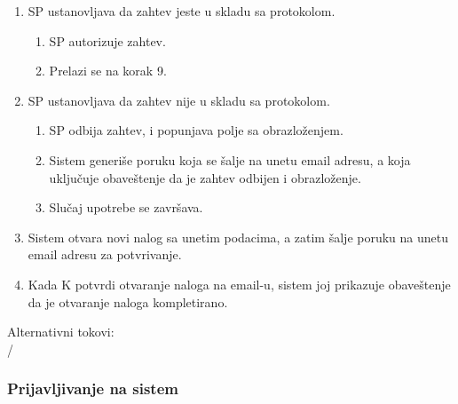 \begin{enumerate}
	\item SP ustanovljava da zahtev jeste u skladu sa protokolom.
	\begin{enumerate}
		\item SP autorizuje zahtev.
		\item Prelazi se na korak 9.
	\end{enumerate}
	\item SP ustanovljava da zahtev nije u skladu sa protokolom.
	\begin{enumerate}
		\item SP odbija zahtev, i popunjava polje sa obrazlo\v zenjem.
		\item Sistem generi\v se poruku koja se \v salje na unetu email adresu, a koja uklju\v cuje obave\v stenje da je zahtev odbijen i obrazlo\v zenje.
		\item Slu\v caj upotrebe se zavr\v sava.
	\end{enumerate}
	\item Sistem otvara novi nalog sa unetim podacima, a zatim \v salje poruku na unetu email adresu za potvr\dj ivanje.
	\item Kada K potvrdi otvaranje naloga na email-u, sistem joj prikazuje obave\v stenje da je otvaranje naloga kompletirano.
\end{enumerate}

\noindent Alternativni tokovi: 
\\/

\subsubsection{Prijavljivanje na sistem}
\label{su: prijavljivanje na sistem}

